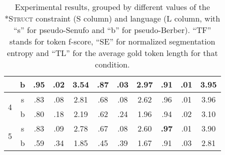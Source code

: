 \documentclass[11pt]{article}
\begin{document}
\begin{table*}[t!]
\begin{center}
{\begin{tabular}{|c|c||c|c|c||c|c|c||c|c|c|}
\cline{2-11} 
 & b & \textbf{.95} & .02 & 3.54 & .87 & .03 & 2.97 & .91 & .01 & 3.95\tabularnewline
\hline 
\hline 
\multirow{2}{*}{4} & s & .83 & .08 & 2.81 & .68 & .08 & 2.62 & .96 & .01 & 3.96\tabularnewline
\cline{2-11} 
 & b & .80 & .18 & 2.19 & .62 & .24 & 1.96 & .94 & .02 & 3.10\tabularnewline
\hline 
\hline 
\multirow{2}{*}{5} & s & .83 & .09 & 2.78 & .67 & .08 & 2.60 & \textbf{.97}  & .01 & 3.90\tabularnewline
\cline{2-11} 
 & b & .59  & .34 & 1.85 & .45 & .39 & 1.67 & .91  & .03 & 2.81\tabularnewline
\hline 
\end{tabular}}
\end{center}
\caption{\label{Results.}Experimental results, grouped by different values of the \textsc{*Struct} constraint (S column) and language (L column, with ``s'' for pseudo-Senufo and ``b'' for pseudo-Berber). ``TF'' stands for token f-score, ``SE'' for normalized segmentation entropy and ``TL'' for the average gold token length for that condition.}	
\end{table*}
\end{document}
